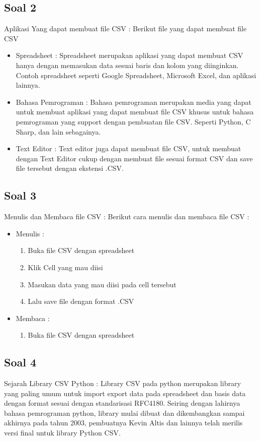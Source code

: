 \begin{itemize}
\begin{itemize}
						  \end{itemize}
\end{itemize}
\subsection{Soal 2}
Aplikasi Yang dapat membuat file CSV : 
Berikut file yang dapat membuat file CSV
\begin{itemize}
	\item Spreadsheet :
	Spreadsheet merupakan aplikasi yang dapat membuat CSV hanya dengan memasukan data sesuai baris dan kolom yang diinginkan. Contoh spreadsheet seperti Google Spreadsheet, Microsoft Excel, dan aplikasi lainnya. 
	\item Bahasa Pemrograman :
	Bahasa pemrograman merupakan media yang dapat untuk membuat aplikasi yang dapat membuat file CSV khusus untuk bahasa pemrograman yang support dengan pembuatan file CSV. Seperti Python, C Sharp, dan lain sebagainya.
	\item Text Editor :
	Text editor juga dapat membuat file CSV, untuk membuat dengan Text Editor cukup dengan membuat file sesuai format CSV dan save file tersebut dengan ekstensi .CSV.
\end{itemize}
\subsection{Soal 3}
Menulis dan Membaca file CSV : 
Berikut cara menulis dan membaca file CSV : 
\begin{itemize}
	\item Menulis : \begin{enumerate}
						\item Buka file CSV dengan spreadsheet
						\item Klik Cell yang mau diisi
						\item Masukan data yang mau diisi pada cell tersebut
						\item Lalu save file dengan format .CSV
					\end{enumerate}
	\item Membaca : \begin{enumerate}
						\item Buka file CSV dengan spreadsheet						
					\end{enumerate}
\end{itemize}
\subsection{Soal 4}
Sejarah Library CSV Python : 
Library CSV pada python merupakan library yang paling umum untuk import export data pada spreadsheet dan basis data dengan format sesuai dengan standarisasi RFC4180. Seiring dengan lahirnya bahasa pemrograman python, library mulai dibuat dan dikembangkan sampai akhirnya pada tahun 2003, pembuatnya Kevin Altis dan lainnya telah merilis versi final untuk library Python CSV. 
